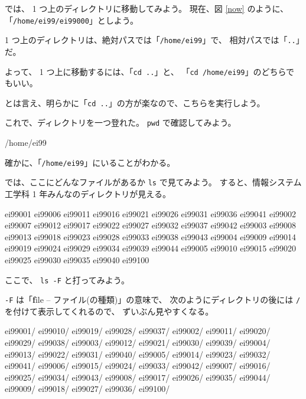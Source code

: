 では、 1 つ上のディレクトリに移動してみよう。
現在、図 \ref{now} のように、「\texttt{/home/ei99/ei99000}」としよう。

 1 つ上のディレクトリは、絶対パスでは「\texttt{/home/ei99}」で、
相対パスでは「\texttt{..}」だ。

よって、 1 つ上に移動するには、「\texttt{cd ..}」と、
「\texttt{cd /home/ei99}」のどちらでもいい。

とは言え、明らかに「\texttt{cd ..}」の方が楽なので、こちらを実行しよう。

\begin{progls}
%
\end{progls}

これで、ディレクトリを一つ登れた。
 \texttt{pwd} で確認してみよう。

\begin{progls}
/home/ei99
%
\end{progls}

確かに、「\texttt{/home/ei99}」にいることがわかる。

\bigskip

では、ここにどんなファイルがあるか \texttt{ls} で見てみよう。
すると、情報システム工学科 1 年みんなのディレクトリが見える。

\begin{progls}
ei99001 ei99006 ei99011 ei99016 ei99021 ei99026 ei99031 ei99036 ei99041
ei99002 ei99007 ei99012 ei99017 ei99022 ei99027 ei99032 ei99037 ei99042
ei99003 ei99008 ei99013 ei99018 ei99023 ei99028 ei99033 ei99038 ei99043
ei99004 ei99009 ei99014 ei99019 ei99024 ei99029 ei99034 ei99039 ei99044
ei99005 ei99010 ei99015 ei99020 ei99025 ei99030 ei99035 ei99040 ei99100
%
\end{progls}

ここで、 \texttt{ls -F} と打ってみよう。

\texttt{-F} は「\textbf{f}ile -- ファイル(の種類)」の意味で、
次のようにディレクトリの後には \texttt{/} を付けて表示してくれるので、
ずいぶん見やすくなる。

\begin{progls}
ei99001/        ei99010/        ei99019/        ei99028/        ei99037/
ei99002/        ei99011/        ei99020/        ei99029/        ei99038/
ei99003/        ei99012/        ei99021/        ei99030/        ei99039/
ei99004/        ei99013/        ei99022/        ei99031/        ei99040/
ei99005/        ei99014/        ei99023/        ei99032/        ei99041/
ei99006/        ei99015/        ei99024/        ei99033/        ei99042/
ei99007/        ei99016/        ei99025/        ei99034/        ei99043/
ei99008/        ei99017/        ei99026/        ei99035/        ei99044/
ei99009/        ei99018/        ei99027/        ei99036/        ei99100/
%
\end{progls}


